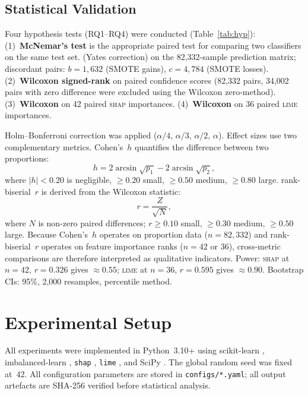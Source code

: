\documentclass[conference,a4paper]{IEEEtran}
\newcommand{\SHAP}{\textsc{shap}\xspace}
\newcommand{\LIME}{\textsc{lime}\xspace}
\newcommand{\rbs}{rank-biserial~$r$\xspace}
\newcommand{\cohensh}{Cohen's~$h$\xspace}
\begin{document}
\subsection{Statistical Validation}
\label{sec:stats}

Four hypothesis tests (RQ1--RQ4) were conducted (Table~\ref{tab:hyp}):
(1)~\textbf{McNemar's test} is the appropriate paired test for comparing two
classifiers on the same test set. (Yates correction) on the 82,332-sample
prediction matrix; discordant pairs: $b=1{,}632$ (SMOTE gains), $c=4{,}784$
(SMOTE losses).
(2)~\textbf{Wilcoxon signed-rank} on paired confidence scores (82,332 pairs,
34,002 pairs with zero difference were excluded using the Wilcoxon zero-method). (3)~\textbf{Wilcoxon} on 42 paired \SHAP
importances. (4)~\textbf{Wilcoxon} on 36 paired \LIME importances.

Holm--Bonferroni correction was applied ($\alpha/4,\,\alpha/3,\,\alpha/2,\,\alpha$).
Effect sizes use two complementary metrics. \cohensh quantifies the difference
between two proportions:
\begin{equation}
  h = 2\arcsin\!\sqrt{p_1} - 2\arcsin\!\sqrt{p_2},
  \label{eq:cohenh}
\end{equation}
where $|h|<0.20$ is negligible, $\geq0.20$ small, $\geq0.50$ medium, $\geq0.80$
large. \rbs is derived from the Wilcoxon statistic:
\begin{equation}
  r = \frac{Z}{\sqrt{N}},
  \label{eq:rbs}
\end{equation}
where $N$ is non-zero paired differences; $r\geq0.10$ small, $\geq0.30$ medium,
$\geq0.50$ large. Because \cohensh operates on proportion data ($n = 82{,}332$)
and \rbs operates on feature importance ranks ($n = 42$ or $36$), cross-metric
comparisons are therefore interpreted as qualitative indicators. Power: \SHAP
at $n=42$, $r=0.326$ gives $\approx0.55$; \LIME at $n=36$, $r=0.595$ gives
$\approx0.90$. Bootstrap CIs: 95\%, 2,000 resamples, percentile method.

\section{Experimental Setup}
\label{sec:setup}

All experiments were implemented in Python~3.10+ using scikit-learn
\cite{pedregosa2011}, imbalanced-learn \cite{lemaitre2017}, \texttt{shap}
\cite{lundberg2017}, \texttt{lime} \cite{ribeiro2016}, and SciPy
\cite{virtanen2020}. The global random seed was fixed at~42. All configuration
parameters are stored in \texttt{configs/*.yaml}; all output artefacts are
SHA-256 verified before statistical analysis.
\end{document}
